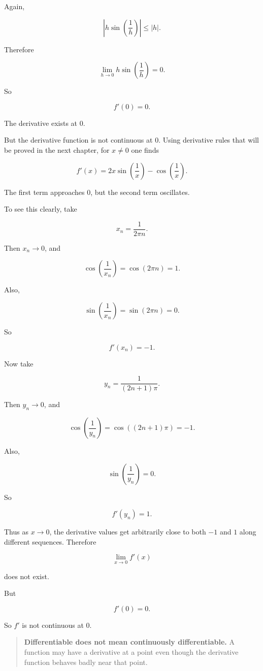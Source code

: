 Again,

\[
\left|h\sin\left(\frac1h\right)\right|\le |h|.
\]

Therefore

\[
\lim_{h\to0}h\sin\left(\frac1h\right)=0.
\]

So

\[
\boxed{f'(0)=0.}
\]

The derivative exists at \(0\).

But the derivative function is not continuous at \(0\).  Using derivative rules that will be proved in the next chapter, for \(x\neq0\) one finds

\[
f'(x)
=
2x\sin\left(\frac1x\right)
-
\cos\left(\frac1x\right).
\]

The first term approaches \(0\), but the second term oscillates.

To see this clearly, take

\[
x_n=\frac{1}{2\pi n}.
\]

Then \(x_n\to0\), and

\[
\cos\left(\frac1{x_n}\right)
=
\cos(2\pi n)
=
1.
\]

Also,

\[
\sin\left(\frac1{x_n}\right)
=
\sin(2\pi n)
=
0.
\]

So

\[
f'(x_n)=-1.
\]

Now take

\[
y_n=\frac{1}{(2n+1)\pi}.
\]

Then \(y_n\to0\), and

\[
\cos\left(\frac1{y_n}\right)
=
\cos((2n+1)\pi)
=
-1.
\]

Also,

\[
\sin\left(\frac1{y_n}\right)=0.
\]

So

\[
f'(y_n)=1.
\]

Thus as \(x\to0\), the derivative values get arbitrarily close to both \(-1\) and \(1\) along different sequences.  Therefore

\[
\lim_{x\to0}f'(x)
\]

does not exist.

But

\[
f'(0)=0.
\]

So \(f'\) is not continuous at \(0\).

\begin{quote}
\textbf{Differentiable does not mean continuously differentiable.}
A function may have a derivative at a point even though the derivative function behaves badly near that point.
\end{quote}

